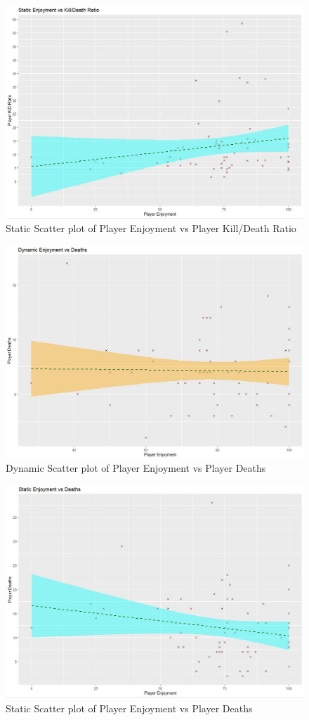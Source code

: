 \documentclass[journal]{IEEEtran}
\begin{document}
\begin{figure}[h]
	\includegraphics[width=0.75\linewidth]{staticfunKDR.jpg}
	\caption{Static Scatter plot of Player Enjoyment vs Player Kill/Death Ratio}
	\label{fig::12}
\end{figure} 

\begin{figure}[h]
	\includegraphics[width=0.75\linewidth]{dynamicfundeath.jpg}
	\caption{Dynamic Scatter plot of Player Enjoyment vs Player Deaths}
	\label{fig::13}
\end{figure} 

\begin{figure}[h]
	\includegraphics[width=0.75\linewidth]{staticfundeath.jpg}
	\caption{Static Scatter plot of Player Enjoyment vs Player Deaths}
	\label{fig::14}
\end{figure}
\end{document}
